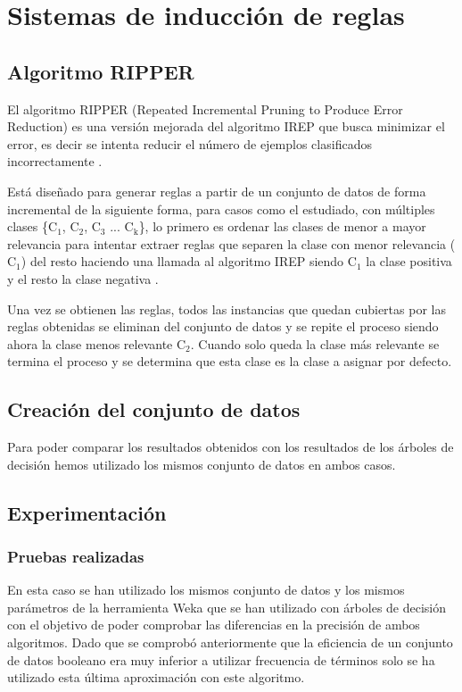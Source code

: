 \section{Sistemas de inducción de reglas}

\subsection{Algoritmo RIPPER}
El algoritmo RIPPER (Repeated Incremental Pruning to Produce Error Reduction) es una versión mejorada del algoritmo IREP que busca minimizar el error, es decir se intenta reducir el número de ejemplos clasificados incorrectamente \cite{A4}. 

Está diseñado para generar reglas a partir de un conjunto de datos de forma incremental de la siguiente forma, para casos como el estudiado, con múltiples clases \{$ \text{C}_{\text{1}}$, $ \text{C}_{\text{2}}$, $ \text{C}_{\text{3}}$ ... $ \text{C}_{\text{k}}$\}, lo primero es ordenar las clases  de menor a mayor relevancia para intentar extraer reglas que separen la clase con menor relevancia ($ \text{C}_{\text{1}}$) del resto haciendo una llamada al algoritmo IREP siendo $ \text{C}_{\text{1}}$ la clase positiva y el resto la clase negativa \cite{M1}. 

Una vez se obtienen las reglas, todos las instancias que quedan cubiertas por las reglas obtenidas se eliminan del conjunto de datos y se repite el proceso siendo ahora la clase menos relevante $ \text{C}_{\text{2}}$. Cuando solo queda la clase más relevante se termina el proceso y se determina que esta clase es la clase a asignar por defecto.
\subsection{Creación del conjunto de datos}
Para poder comparar los resultados obtenidos con los resultados de los árboles de decisión hemos utilizado los mismos conjunto de datos en ambos casos.

\subsection{Experimentación}
\subsubsection{Pruebas realizadas}
En esta caso se han utilizado los mismos conjunto de datos y los mismos parámetros de la herramienta Weka que se han utilizado con árboles de decisión con el objetivo de poder comprobar las diferencias en la precisión de ambos algoritmos. Dado que se comprobó anteriormente que la eficiencia de un conjunto de datos booleano era muy inferior a utilizar frecuencia de términos solo se ha utilizado esta última aproximación con este algoritmo.

